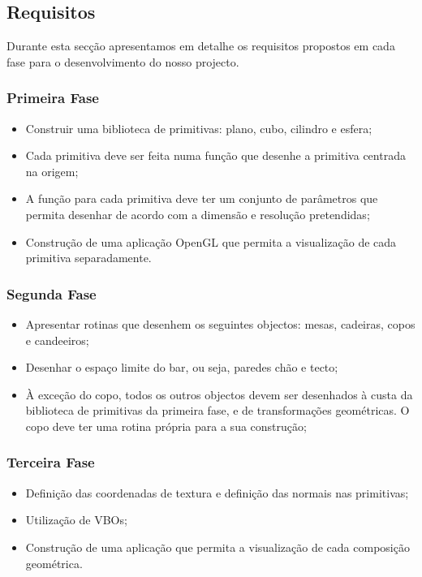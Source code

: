 \documentclass[a5paper,onecolumn, 11pt]{article}
\begin{document}
\newpage
\onecolumn
\subsection{Requisitos}
Durante esta secção apresentamos em detalhe os requisitos propostos em cada fase para o desenvolvimento do nosso projecto.
\subsubsection{Primeira Fase}
\begin{itemize}
    \item{Construir uma biblioteca de primitivas: plano, cubo, cilindro e esfera;}
    \item{Cada primitiva deve ser feita numa função que desenhe a primitiva centrada na origem;}
    \item{A função para cada primitiva deve ter um conjunto de parâmetros que permita desenhar de acordo com a dimensão e resolução pretendidas;}
    \item{Construção de uma aplicação OpenGL que permita a visualização de cada primitiva separadamente.}
\end{itemize}
\newpage
\subsubsection{Segunda Fase}
\begin{itemize}
    \item{Apresentar rotinas que desenhem os seguintes objectos: mesas, cadeiras, copos e candeeiros;}
    \item{Desenhar o espaço limite do bar, ou seja, paredes chão e tecto;}
    \item{À exceção do copo, todos os outros objectos devem ser desenhados à custa da biblioteca de primitivas da primeira fase, e de transformações geométricas. O copo deve ter uma rotina própria para a sua construção;}
\end{itemize}
\subsubsection{Terceira Fase}
\begin{itemize}
    \item{Definição das coordenadas de textura e definição das normais nas primitivas;}
    \item{Utilização de VBOs;}
    \item{Construção de  uma aplicação que permita a visualização de cada composição geométrica.} 
\end{itemize}
\newpage
\end{document}
